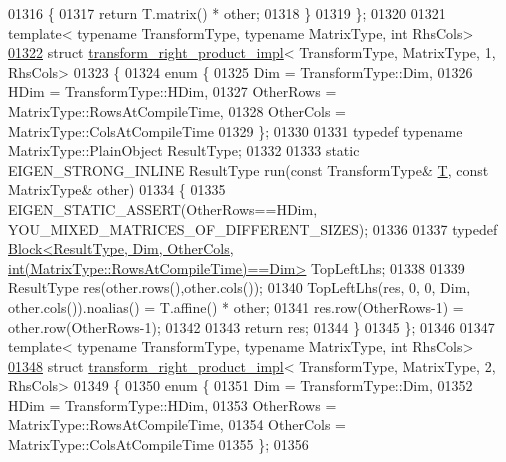 \begin{DoxyCode}
01316   \{
01317     \textcolor{keywordflow}{return} T.matrix() * other;
01318   \}
01319 \};
01320 
01321 \textcolor{keyword}{template}< \textcolor{keyword}{typename} TransformType, \textcolor{keyword}{typename} MatrixType, \textcolor{keywordtype}{int} RhsCols>
\hyperlink{struct_eigen_1_1internal_1_1transform__right__product__impl_3_01_transform_type_00_01_matrix_type_00_011_00_01_rhs_cols_01_4}{01322} \textcolor{keyword}{struct }\hyperlink{struct_eigen_1_1internal_1_1transform__right__product__impl}{transform\_right\_product\_impl}< TransformType, MatrixType, 1, RhsCols>
01323 \{
01324   \textcolor{keyword}{enum} \{ 
01325     Dim = TransformType::Dim, 
01326     HDim = TransformType::HDim,
01327     OtherRows = MatrixType::RowsAtCompileTime,
01328     OtherCols = MatrixType::ColsAtCompileTime
01329   \};
01330 
01331   \textcolor{keyword}{typedef} \textcolor{keyword}{typename} MatrixType::PlainObject ResultType;
01332 
01333   \textcolor{keyword}{static} EIGEN\_STRONG\_INLINE ResultType run(\textcolor{keyword}{const} TransformType& \hyperlink{group___sparse_core___module}{T}, \textcolor{keyword}{const} MatrixType& other)
01334   \{
01335     EIGEN\_STATIC\_ASSERT(OtherRows==HDim, YOU\_MIXED\_MATRICES\_OF\_DIFFERENT\_SIZES);
01336 
01337     \textcolor{keyword}{typedef} 
      \hyperlink{group___core___module_class_eigen_1_1_block}{Block<ResultType, Dim, OtherCols, int(MatrixType::RowsAtCompileTime)==Dim>}
       TopLeftLhs;
01338 
01339     ResultType res(other.rows(),other.cols());
01340     TopLeftLhs(res, 0, 0, Dim, other.cols()).noalias() = T.affine() * other;
01341     res.row(OtherRows-1) = other.row(OtherRows-1);
01342     
01343     \textcolor{keywordflow}{return} res;
01344   \}
01345 \};
01346 
01347 \textcolor{keyword}{template}< \textcolor{keyword}{typename} TransformType, \textcolor{keyword}{typename} MatrixType, \textcolor{keywordtype}{int} RhsCols>
\hyperlink{struct_eigen_1_1internal_1_1transform__right__product__impl_3_01_transform_type_00_01_matrix_type_00_012_00_01_rhs_cols_01_4}{01348} \textcolor{keyword}{struct }\hyperlink{struct_eigen_1_1internal_1_1transform__right__product__impl}{transform\_right\_product\_impl}< TransformType, MatrixType, 2, RhsCols>
01349 \{
01350   \textcolor{keyword}{enum} \{ 
01351     Dim = TransformType::Dim, 
01352     HDim = TransformType::HDim,
01353     OtherRows = MatrixType::RowsAtCompileTime,
01354     OtherCols = MatrixType::ColsAtCompileTime
01355   \};
01356 

\end{DoxyCode}
